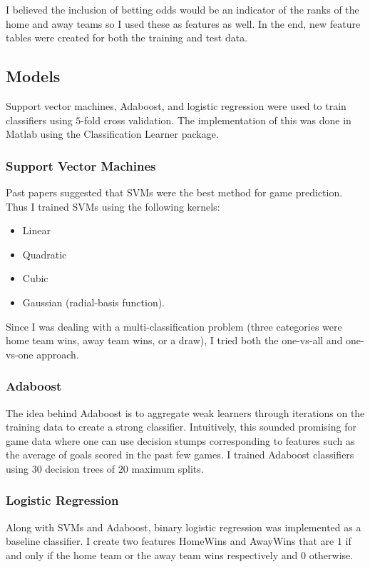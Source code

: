 \documentclass[paper=a4, fontsize=11pt]{scrartcl}
\numberwithin{equation}{section}		%
\numberwithin{figure}{section}			%
\numberwithin{table}{section}				%
\begin{document}
I believed the inclusion of betting odds would be an indicator of the ranks of the home and away teams so I used these as features as well. In the end, new feature tables were created for both the training and test data.

\subsection{Models}

Support vector machines, Adaboost, and logistic regression were used to train classifiers using $5$-fold cross validation. The implementation of this was done in Matlab using the Classification Learner package.

\subsubsection{Support Vector Machines}

Past papers suggested that SVMs were the best method for game prediction. Thus I trained SVMs using the following kernels:
\begin{itemize}
\item Linear
\item Quadratic
\item Cubic
\item Gaussian (radial-basis function).
\end{itemize}

Since I was dealing with a multi-classification problem (three categories were home team wins, away team wins, or a draw), I tried both the one-vs-all and one-vs-one approach.

\subsubsection{Adaboost}

The idea behind Adaboost is to aggregate weak learners through iterations on the training data to create a strong classifier. Intuitively, this sounded promising for game data where one can use decision stumps corresponding to features such as the average of goals scored in the past few games. I trained Adaboost classifiers using $30$ decision trees of $20$ maximum splits.

\subsubsection{Logistic Regression}

Along with SVMs and Adaboost, binary logistic regression was implemented as a baseline classifier. I create two features HomeWins and AwayWins that are $1$ if and only if the home team or the away team wins respectively and $0$ otherwise.
\end{document}
